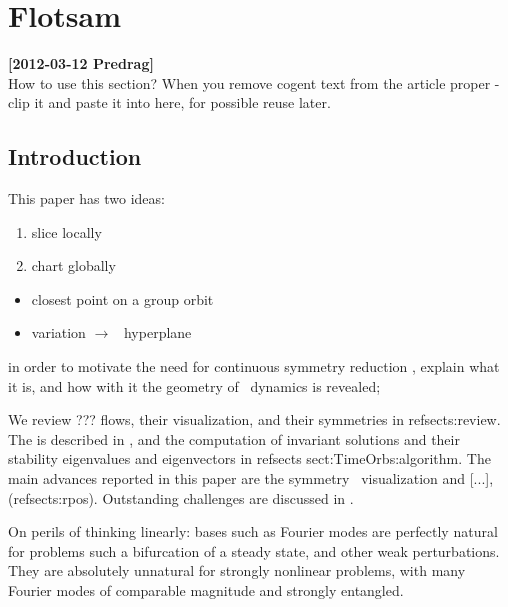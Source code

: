 
\section{Flotsam}
\label{s:flotsam}

\noindent
{\bf [2012-03-12 Predrag]}
\\
How to use this section? When you remove cogent text from the article
proper - clip  it and paste it into here, for possible reuse later.

\subsection{Introduction}
\label{s:introFlot}

This paper has two ideas:
\begin{enumerate}
  \item slice locally
  \item chart globally
\end{enumerate}

    \begin{itemize}
      \item closest point on a group orbit
      \item variation $\to$ \slice\ hyperplane
    \end{itemize}

    in order to motivate the need for continuous symmetry reduction , explain
    what it is, and how with it the geometry of \statesp\ dynamics is revealed;

We review  ??? flows, their visualization, and their symmetries in
refsect{s:review}. The {\mslices}  is described in ,
and the computation of invariant solutions and their stability
eigenvalues and eigenvectors in refsects {sect:TimeOrb}{s:algorithm}.
The main advances reported in this paper are the symmetry \reducedsp\
visualization and [...], (refsect{s:rpos}). Outstanding challenges are
discussed in \refsect{s:concl}.


On perils of thinking linearly: bases such as Fourier modes are
perfectly natural for problems such a bifurcation of a steady state, and
other weak perturbations. They are absolutely unnatural for strongly
nonlinear problems, with many Fourier modes of comparable magnitude and
strongly entangled.


